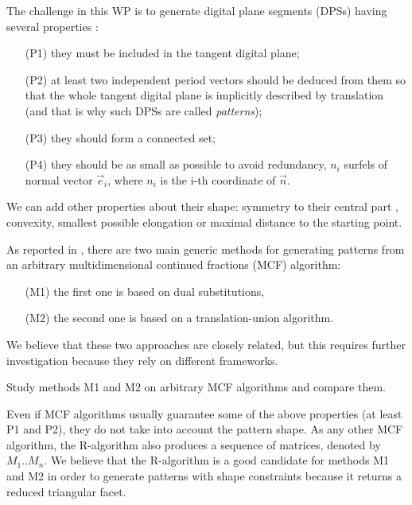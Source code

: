 The challenge in this WP is to generate digital plane segments (DPSs)
having several properties \cite{Jamet2016}:
\begin{enumerate}
\item[(P1)] they must be included in the tangent digital plane;
\item[(P2)] at least two independent period vectors should be deduced from them
  so that the whole tangent digital plane is implicitly described by translation
  (and that is why such DPSs are called \emph{patterns});
\item[(P3)] they should form a connected set;
\item[(P4)] they should be as small as possible to avoid redundancy,
  \eg $n_i$ surfels of normal vector $\vec{e}_i$, where $n_i$ is the i-th coordinate
  of $\vec{n}$. 
\end{enumerate}
We can add other properties about their shape: symmetry to their central part \cite{Labbe2015},
convexity, smallest possible elongation or maximal distance to the starting point.

As reported in , there are two main generic methods for generating patterns
from an arbitrary multidimensional continued fractions (MCF) algorithm:
\begin{itemize}
\item[(M1)] the first one is based on dual substitutions, 
\item[(M2)] the second one is based on a translation-union algorithm.
\end{itemize}
We believe that these two approaches are closely related, but this requires
further investigation because they rely on different frameworks. 


\begin{Task}
  \label{task:genmeth}
  Study methods M1 and M2 on arbitrary MCF algorithms and compare them.   
\end{Task}

Even if MCF algorithms usually guarantee some of the above properties (at least P1 and P2),
they do not take into account the pattern shape. As any other MCF algorithm, the R-algorithm
also produces a sequence of matrices, denoted by $M_1..M_n$. We believe that the R-algorithm
is a good candidate for methods M1 and M2 in order to generate patterns with shape
constraints because it returns a reduced triangular facet.

